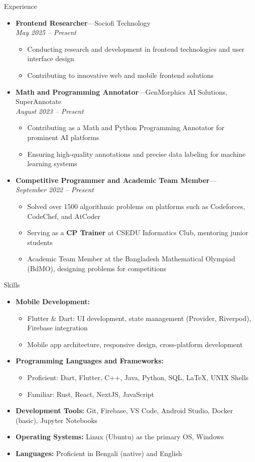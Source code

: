 \documentclass[10pt,oneside]{article}
\newenvironment{ressection}[1]{
  \vspace{4pt}
  {\fontfamily{phv}\selectfont\Large#1}
  \begin{itemize}
  \vspace{3pt}
}{
  \end{itemize}
}
\newcommand{\resitem}[1]{
  \vspace{-4pt}
  \item \begin{flushleft} #1 \end{flushleft}
}
\newcommand{\ressubitem}[1]{
  \vspace{-1pt}
  \item \begin{flushleft} #1 \end{flushleft}
}
\newcommand{\resbigitem}[3]{
  \vspace{-5pt}
  \item
  \textbf{#1}---#2 \\
  \textit{#3}
}
\newenvironment{ressubsec}[3]{
  \resbigitem{#1}{#2}{#3}
  \vspace{-2pt}
  \begin{itemize}
}{
  \end{itemize}
}
\newenvironment{reslist}[1]{
  \resitem{\textbf{#1}}
  \vspace{-5pt}
  \begin{itemize}
}{
  \end{itemize}
}
\begin{document}
\begin{ressection}{Experience}

    \begin{ressubsec}{Frontend Researcher}{Sociofi Technology}{May 2025 -- Present}
        \ressubitem{Conducting research and development in frontend technologies and user interface design}
        \ressubitem{Contributing to innovative web and mobile frontend solutions}
    \end{ressubsec}

    \begin{ressubsec}{Math and Programming Annotator}{GenMorphics AI Solutions, SuperAnnotate}{August 2023 -- Present}
        \ressubitem{Contributing as a Math and Python Programming Annotator for prominent AI platforms}
        \ressubitem{Ensuring high-quality annotations and precise data labeling for machine learning systems}
    \end{ressubsec}
    
    \begin{ressubsec}{Competitive Programmer and Academic Team Member}{}{September 2022 -- Present}
        \ressubitem{Solved over 1500 algorithmic problems on platforms such as Codeforces, CodeChef, and AtCoder}
        \ressubitem{Serving as a \textbf{CP Trainer} at CSEDU Informatics Club, mentoring junior students}
        \ressubitem{Academic Team Member at the Bangladesh Mathematical Olympiad (BdMO), designing problems for competitions}
    \end{ressubsec}

\end{ressection}


\begin{ressection}{Skills}

    \begin{reslist}{Mobile Development:}
        \ressubitem{Flutter \& Dart: UI development, state management (Provider, Riverpod), Firebase integration}
        \ressubitem{Mobile app architecture, responsive design, cross-platform development}
    \end{reslist}

  \begin{reslist}{Programming Languages and Frameworks:}
    \ressubitem{Proficient: Dart, Flutter, C++, Java, Python, SQL, \LaTeX, UNIX Shells}
    \ressubitem{Familiar: Rust, React, NextJS, JavaScript}
  \end{reslist}

    \resitem{\textbf{Development Tools:} Git, Firebase, VS Code, Android Studio, Docker (basic), Jupyter Notebooks}

    \resitem{\textbf{Operating Systems:} Linux (Ubuntu) as the primary OS, Windows}

  \resitem{\textbf{Languages:} Proficient in Bengali (native) and English}

\end{ressection}
\end{document}
